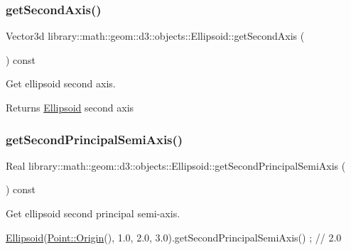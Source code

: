 \subsubsection{\texorpdfstring{get\+Second\+Axis()}{getSecondAxis()}}
{\footnotesize\ttfamily Vector3d library\+::math\+::geom\+::d3\+::objects\+::\+Ellipsoid\+::get\+Second\+Axis (\begin{DoxyParamCaption}{ }\end{DoxyParamCaption}) const}



Get ellipsoid second axis. 

\begin{DoxyReturn}{Returns}
\hyperlink{classlibrary_1_1math_1_1geom_1_1d3_1_1objects_1_1_ellipsoid}{Ellipsoid} second axis 
\end{DoxyReturn}
\mbox{\label{classlibrary_1_1math_1_1geom_1_1d3_1_1objects_1_1_ellipsoid_abdc2cc0bed7d473f0d4f572afd0de054}} 
\subsubsection{\texorpdfstring{get\+Second\+Principal\+Semi\+Axis()}{getSecondPrincipalSemiAxis()}}
{\footnotesize\ttfamily Real library\+::math\+::geom\+::d3\+::objects\+::\+Ellipsoid\+::get\+Second\+Principal\+Semi\+Axis (\begin{DoxyParamCaption}{ }\end{DoxyParamCaption}) const}



Get ellipsoid second principal semi-\/axis. 


\begin{DoxyCode}
\hyperlink{classlibrary_1_1math_1_1geom_1_1d3_1_1objects_1_1_ellipsoid_aae81fe0edc7f0e8d4590ea89ae73cb14}{Ellipsoid}(\hyperlink{classlibrary_1_1math_1_1geom_1_1d3_1_1objects_1_1_point_ab2a38e285c562e50bf350272c083986f}{Point::Origin}(), 1.0, 2.0, 3.0).getSecondPrincipalSemiAxis() ; \textcolor{comment}{// 2.0}
\end{DoxyCode}



